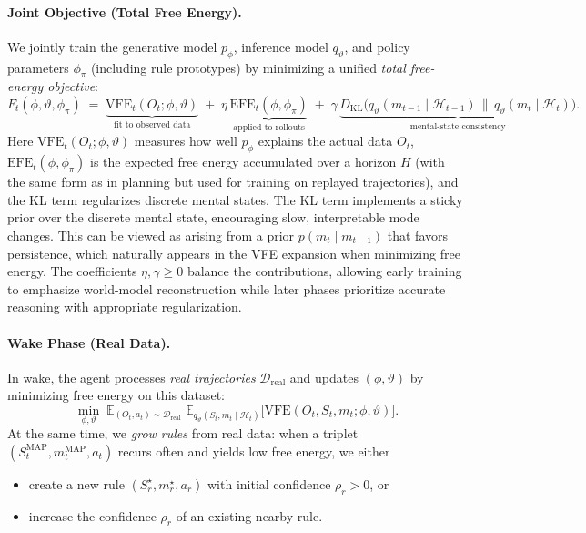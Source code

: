 \documentclass{article} %
\newcommand{\revise}[1]{#1}
\begin{document}
\paragraph{Joint Objective (Total Free Energy).}
We jointly train the generative model $p_\phi$, inference model $q_\vartheta$, and policy parameters $\phi_\pi$ 
(including rule prototypes) by minimizing a unified \emph{total free-energy objective}:
{\small\begin{equation}
\label{eq:total_objective}
F_t(\phi,\vartheta,\phi_\pi)
\;=\;
\underbrace{\text{VFE}_t(O_t;\phi,\vartheta)}_{\text{fit to observed data}}
\;+\; \eta\,\underbrace{\text{EFE}_t(\phi,\phi_\pi)}_{\text{applied to rollouts}}
\;+\; \gamma\,\underbrace{D_{\mathrm{KL}}\!\big(q_\vartheta(m_{t-1}\mid\mathcal H_{t-1})\,\|\,q_\vartheta(m_t\mid\mathcal H_t)\big)}_{\text{mental-state consistency}}.
\end{equation}}
Here $\text{VFE}_t(O_t;\phi,\vartheta)$ measures how well $p_\phi$ explains the actual data $O_t$, 
$\text{EFE}_t(\phi,\phi_\pi)$ is the expected free energy accumulated over a horizon $H$ (with the same form as in planning but used for training on replayed trajectories), 
and the KL term regularizes discrete mental states. \revise{The KL term implements a sticky prior over the discrete mental state, encouraging slow, interpretable mode changes.} This can be viewed as arising from a prior $p(m_t \mid m_{t-1})$ that favors persistence, which naturally appears in the VFE expansion when minimizing free energy. The coefficients $\eta,\gamma \ge 0$ balance the contributions, allowing early training to emphasize world-model reconstruction while later phases prioritize accurate reasoning with appropriate regularization. 

\paragraph{Wake Phase (Real Data).}
In wake, the agent processes \emph{real trajectories} $\mathcal D_{\mathrm{real}}$ and updates 
$(\phi,\vartheta)$ by minimizing free energy on this dataset:
{\small\[
\min_{\phi,\vartheta}\; 
\mathbb{E}_{(O_t,a_t)\sim \mathcal D_{\mathrm{real}}}\;
\mathbb{E}_{q_\vartheta(S_t,m_t\mid \mathcal H_t)}
\big[\text{VFE}(O_t,S_t,m_t;\phi,\vartheta)\big].
\]}
At the same time, we \emph{grow rules} from real data: when a triplet 
$(S_t^{\mathrm{MAP}}, m_t^{\mathrm{MAP}}, a_t)$ recurs often and yields low free energy, we either  
\begin{itemize}
\item[(i)] create a new rule $(S_r^\star, m_r^\star, a_r)$ with initial confidence $\rho_r>0$, or  
\item[(ii)] increase the confidence $\rho_r$ of an existing nearby rule.  
\end{itemize}
\end{document}

